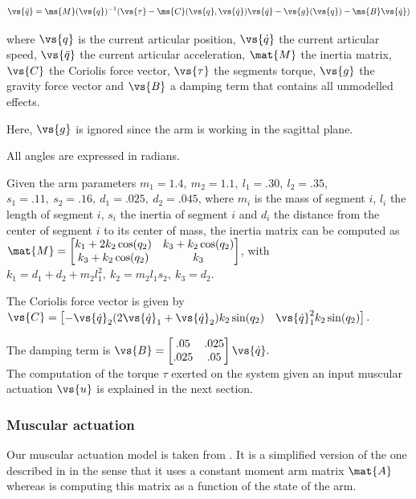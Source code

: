 \documentclass[10pt]{article}
\newcommand{\q}{\vs{q}}
\newcommand{\dq}{\vs{\dot{q}}}
\newcommand{\ddq}{\vs{\ddot{q}}}
\newcommand{\vt}{\vs{\tau}}          %
\begin{document}
\begin{equation}
\label{eq:rbd}
    \ddq = \ms{M}(\q)^{-1} (\vt - \ms{C}(\q, \dq) \dq - \vs{g}(\q)  - \ms{B} \dq) 
\end{equation}

where $\vs{q}$ is the current articular position, $\dq$ the current articular speed, $\ddq$ the current articular acceleration, $\mat{M}$ the inertia matrix, $\vs{C}$ the Coriolis force vector, $\vs{\tau}$ the segments torque, $\vs{g}$ the gravity force vector and $\vs{B}$ a damping term that contains all unmodelled effects.

Here, $\vs{g}$ is ignored since the arm is working in the sagittal plane.

All angles are expressed in radians.

Given the arm parameters $m_1 = 1.4, ~ m_2 = 1.1, ~ l_1 = .30, ~ l_2 = .35$,
$s_1 = .11, ~ s_2 = .16, ~ d_1 = .025, ~ d_2 = .045$, where $m_i$ is the mass of segment $i$, $l_i$ the length of segment $i$, $s_i$ the inertia of segment $i$ and $d_i$ the distance from the center of segment $i$ to its center of mass, the inertia matrix can be computed as
$
 \mat{M} = \begin{bmatrix}
           k_1 + 2 k_2 \cos(q_2)   &  k_3 + k_2 \cos(q_2) \\%
           k_3 + k_2 \cos(q_2)     &  k_3
          \end{bmatrix}
$, with $k_1 = d_1 + d_2 + m_2 l_1^2, ~ k_2 = m_2 l_1 s_2, ~ k_3 = d_2$.

The Coriolis force vector is given by
$
\vs{C} = \begin{bmatrix}
           -\dq_2 (2 \dq_1 + \dq_2) k_2 \sin(q_2) & \dq_1^2 k_2 \sin(q_2)
          \end{bmatrix}.
$

The damping term is 
$\vs{B} = \begin{bmatrix}
           .05 & .025 \\
          .025 & .05
     \end{bmatrix} \dq.$\\

The computation of the torque $\tau$ exerted on the system given an input muscular actuation $\vs{u}$ is explained in the next section.

\subsubsection{Muscular actuation}

Our muscular actuation model is taken from \cite{katayama93}. It is a simplified version of the one described in \cite{li2006} in the sense that it uses a constant moment arm matrix $\mat{A}$ whereas \cite{li2006} is computing this matrix as a function of the state of the arm.
\end{document}
